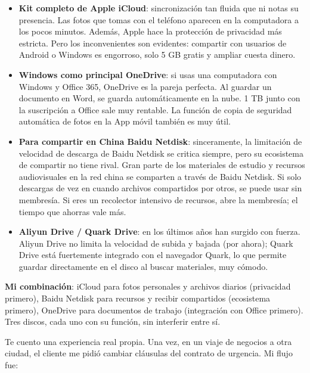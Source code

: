 \begin{itemize}
  \item \textbf{Kit completo de Apple iCloud}: sincronización tan fluida que ni notas su presencia. Las fotos que tomas con el teléfono aparecen en la computadora a los pocos minutos. Además, Apple hace la protección de privacidad más estricta. Pero los inconvenientes son evidentes: compartir con usuarios de Android o Windows es engorroso, solo 5 GB gratis y ampliar cuesta dinero.
  \item \textbf{Windows como principal OneDrive}: si usas una computadora con Windows y Office 365, OneDrive es la pareja perfecta. Al guardar un documento en Word, se guarda automáticamente en la nube. 1 TB junto con la suscripción a Office sale muy rentable. La función de copia de seguridad automática de fotos en la App móvil también es muy útil.
  \item \textbf{Para compartir en China Baidu Netdisk}: sinceramente, la limitación de velocidad de descarga de Baidu Netdisk se critica siempre, pero su ecosistema de compartir no tiene rival. Gran parte de los materiales de estudio y recursos audiovisuales en la red china se comparten a través de Baidu Netdisk. Si solo descargas de vez en cuando archivos compartidos por otros, se puede usar sin membresía. Si eres un recolector intensivo de recursos, abre la membresía; el tiempo que ahorras vale más.
  \item \textbf{Aliyun Drive / Quark Drive}: en los últimos años han surgido con fuerza. Aliyun Drive no limita la velocidad de subida y bajada (por ahora); Quark Drive está fuertemente integrado con el navegador Quark, lo que permite guardar directamente en el disco al buscar materiales, muy cómodo.
\end{itemize}

\textbf{Mi combinación}: iCloud para fotos personales y archivos diarios (privacidad primero), Baidu Netdisk para recursos y recibir compartidos (ecosistema primero), OneDrive para documentos de trabajo (integración con Office primero). Tres discos, cada uno con su función, sin interferir entre sí.


Te cuento una experiencia real propia. Una vez, en un viaje de negocios a otra ciudad, el cliente me pidió cambiar cláusulas del contrato de urgencia. Mi flujo fue:

